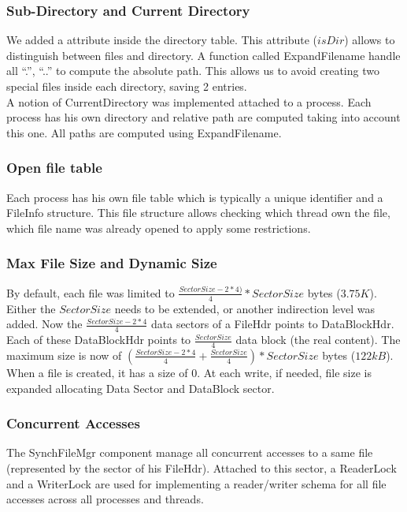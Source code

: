\subsubsection{Sub-Directory and Current Directory}

We added a attribute inside the directory table. This attribute ($isDir$) allows
to distinguish between files and directory. A function called
\textrm{ExpandFilename} handle all ``.'', ``..'' to compute the absolute
path. This allows us to avoid creating two special files inside each directory,
saving 2 entries.\\

A notion of CurrentDirectory was implemented attached to a process. Each process
has his own directory and relative path are computed taking into account this
one. All paths are computed using ExpandFilename.

\subsubsection{Open file table}
Each process has his own file table which is typically a unique identifier and a
FileInfo structure. This file structure allows checking which thread own the
file, which file name was already opened to apply some restrictions.

\subsubsection{Max File Size and Dynamic Size}
By default, each file was limited to $\frac{SectorSize - 2*4)}{4} * SectorSize$
bytes ($3.75K$). Either the $SectorSize$ needs to be extended, or another
indirection level was added.
Now the $\frac{SectorSize - 2*4}{4}$ data sectors of a FileHdr points to
DataBlockHdr. Each of these DataBlockHdr points to $\frac{SectorSize}{4}$ data
block (the real content).
The maximum size is now of $(\frac{SectorSize - 2*4}{4} +
\frac{SectorSize}{4})*SectorSize$ bytes ($122kB$).\\

When a file is created, it has a size of $0$. At each write, if needed, file size is
expanded allocating Data Sector and DataBlock sector.

\subsubsection{Concurrent Accesses}
The SynchFileMgr component manage all concurrent accesses to a same file
(represented by the sector of his FileHdr). Attached to this sector, a
ReaderLock and a WriterLock are used for implementing a reader/writer schema for
all file accesses across all processes and threads.

